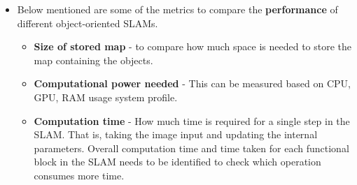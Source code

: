 \documentclass[report.tex]{subfiles}
\begin{document}
\begin{itemize}
\item Below mentioned are some of the metrics to compare the \textbf{performance} of different object-oriented SLAMs.
\begin{itemize}
    \item \textbf{Size of stored map} - to compare how much space is needed to store the map containing the objects. 
    \item \textbf{Computational power needed} - This can be measured based on CPU, GPU, RAM usage system profile.
    \item \textbf{Computation time} - How much time is required for a single step in the SLAM. That is, taking the image input and updating the internal parameters. Overall computation time and time taken for each functional block in the SLAM needs to be identified to check which operation consumes more time.
\end{itemize}
\end{itemize}
\end{document}
